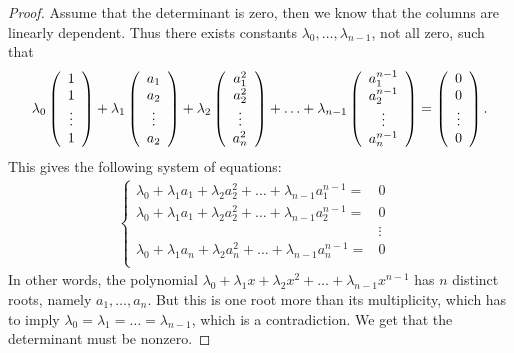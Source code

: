 \begin{proof}
    Assume that the determinant is zero, then we know that the columns are linearly dependent. 
    Thus there exists constants $\lambda_0,\dots,\lambda_{n-1}$, not all zero, such that
    \begin{align*}
        \lambda_0
        \left( \begin{array}{c} 
            1\\ 
            1\\ 
            \vdots\\ 
            1
        \end{array}\right) 
        + \lambda_1
        \left( \begin{array}{c} 
            a_1\\ 
            a_2\\ 
            \vdots\\ 
            a_2
        \end{array}\right) 
        + \lambda_2
        \left( \begin{array}{c} 
            a_1^2\\ 
            a_2^2\\ 
            \vdots\\ 
            a_n^2
        \end{array}\right) 
        + \hdots 
        + \lambda_{n-1}
        \left( 
        \begin{array}{c} 
            a_1^{n-1}\\ 
            a_2^{n-1}\\ 
            \vdots\\ 
            a_n^{n-1}
        \end{array}\right) 
        = \left( 
        \begin{array}{c} 
            0\\ 
            0\\ 
            \vdots\\ 
            0
        \end{array}\right).
    \end{align*}
    This gives the following system of equations:
    \begin{align*}
    \left\{
        \begin{array}{lll}
        \lambda_0 + \lambda_1 a_1 + \lambda_2 a_2^2 + \hdots + \lambda_{n-1} a_1^{n-1} =& 0\\
        \lambda_0 + \lambda_1 a_1 + \lambda_2 a_2^2 + \hdots + \lambda_{n-1} a_2^{n-1} =& 0\\
        & \vdots & \\
        \lambda_0 + \lambda_1 a_n + \lambda_2 a_n^2 + \hdots + \lambda_{n-1} a_n^{n-1} =& 0\\
   \end{array}\right.
    \end{align*}
   In other words, the polynomial $\lambda_0 + \lambda_1 x + \lambda_2 x^2 + \dots + \lambda_{n-1}x^{n-1}$ has $n$ distinct roots, namely $a_1,\dots,a_n$. 
   But this is one root more than its multiplicity, which has to imply $\lambda_0 = \lambda_1 = \dots = \lambda_{n-1}$, which is a contradiction. 
   We get that the determinant must be nonzero.
\end{proof}

